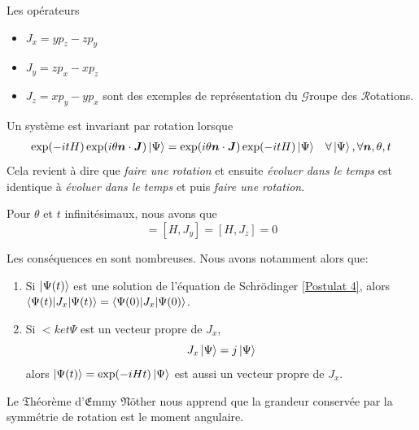 \documentclass[../notesdecours.tex]{subfiles}
\begin{document}
\begin{exemple}Les opérateurs
\begin{itemize}
\item $J_x = yp_z - zp_y$
\item $J_y = zp_x - xp_z$
\item $J_z = xp_y - yp_x$
sont des exemples de représentation du $\mathcal{G}$roupe des $\mathcal{R}$otations.
\end{itemize}
\end{exemple}
Un système est invariant par rotation lorsque
\begin{align*}
\exp (-itH) \exp (i\theta \bm{n}\cdot\bm{J})\ket{\Psi} &= \exp (i\theta \bm{n}\cdot\bm{J})\exp (-itH) \ket{\Psi}			&\forall \ket{\Psi},\forall \bm{n},\theta,t
\end{align*}
Cela revient à dire que \emph{faire une rotation} et ensuite \emph{évoluer dans le temps} est identique à \emph{évoluer dans le temps} et puis \emph{faire une rotation}.\\
\begin{lemma} Pour $\theta$ et $t$ infinitésimaux, nous avons que 
\begin{equation}
[H,J_x] = [H,J_y] = [H,J_z] = 0
\end{equation}
\end{lemma}
Les conséquences en sont nombreuses. Nous avons notamment alors que:
\begin{enumerate}
\item Si $\ket{\Psi(t)}$ est une solution de l'équation de Schrödinger \eqref{Postulat 4}, alors $\braket{\Psi(t)|J_x|\Psi(t)} = \braket{\Psi(0)|J_x|\Psi(0)}$.
\item Si $<ket{\Psi}$ est un vecteur propre de $J_x$,
\begin{equation}
J_x\ket{\Psi} = j\ket{\Psi}
\end{equation}
alors $\ket{\Psi(t)} = \exp (-iHt)\ket{\Psi}$ est aussi un vecteur propre de $J_x$.
\end{enumerate}
Le $\mathfrak{T}$héorème d'$\mathfrak{E}$mmy $\mathfrak{N}$öther nous apprend que la grandeur conservée par la symmétrie de rotation est le moment angulaire.
\end{document}
